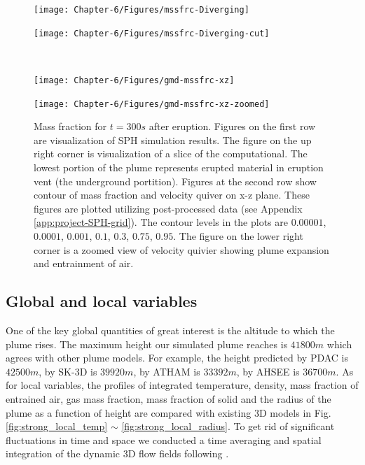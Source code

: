 \begin{figure}
    \centering
    \begin{minipage}{.45\textwidth}
        \centering
        \texttt{[image: Chapter-6/Figures/mssfrc-Diverging]}
    \end{minipage}%
    \begin{minipage}{.45 \textwidth}
        \centering
        \texttt{[image: Chapter-6/Figures/mssfrc-Diverging-cut]}
    \end{minipage}%
    \\
    \begin{minipage}{.45 \textwidth}
        \centering
        \texttt{[image: Chapter-6/Figures/gmd-mssfrc-xz]}
    \end{minipage}%
    \begin{minipage}{.45 \textwidth}
        \centering
        \texttt{[image: Chapter-6/Figures/gmd-mssfrc-xz-zoomed]}
    \end{minipage}%
    \caption{Mass fraction for $t=300s$ after eruption. Figures on the first row are visualization of SPH simulation results. The figure on the up right corner is visualization of a slice of the computational. The lowest portion of the plume represents erupted material in eruption vent (the underground portition). Figures at the second row show contour of mass fraction and velocity quiver on x-z plane. These figures are plotted utilizing post-processed data (see Appendix \ref{app:project-SPH-grid}). The contour levels in the plots are $0.00001$, $0.0001$, $0.001$, $0.1$, $0.3$, $0.75$, $0.95$. The figure on the lower right corner is a zoomed view of velocity quivier showing plume expansion and entrainment of air.}
    \label{fig:pinatubo-simulation-results-vis}
\end{figure}

\subsection{Global and local variables}
One of the key global quantities of great interest is the altitude to which the plume rises. The maximum height our simulated plume reaches is $41800 m$ which agrees with other plume models. For example, the height predicted by PDAC is $42500 m$, by SK-3D is $39920 m$, by ATHAM is $33392 m$, by AHSEE is $36700 m$. As for local variables, the profiles of integrated temperature, density, mass fraction of entrained air, gas mass fraction, mass fraction of solid and the radius of the plume as a function of height are compared with existing 3D models in Fig. \ref{fig:strong_local_temp} $\sim$ \ref{fig:strong_local_radius}. To get rid of significant fluctuations in time and space we conducted a time averaging and spatial integration of the dynamic 3D flow fields following \citet {cerminara2016large}.

